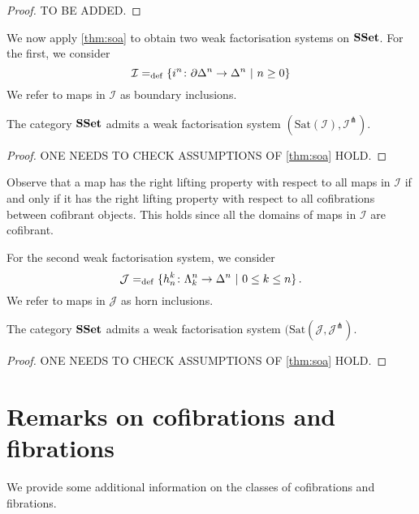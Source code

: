 \documentclass[reqno,10pt,a4paper,oneside,draft]{amsart}
\begin{document}
\begin{proof} TO BE ADDED.
\end{proof}


\bigskip




We now apply \cref{thm:soa} to obtain two weak factorisation systems on $\SSet$. For the first, 
we consider 
\[
\cal{I} \defeq \{ \inc{n} \co  \partial \Delt{n} \to \Delt{n} \ | \ n \geq 0 \}
\]
We refer to maps in $\mathcal{I}$ as boundary inclusions. 

\begin{proposition} The category $\SSet$ admits a weak factorisation system $(\mathrm{Sat}(\mathcal{I}), 
\mathcal{I}^\pitchfork)$.
\end{proposition}

\begin{proof} ONE NEEDS TO CHECK ASSUMPTIONS OF \cref{thm:soa} HOLD.
\end{proof}



Observe that  a map has the right lifting property with respect to all maps in $\mathcal{I}$
if and only if it has the right lifting property with respect to all cofibrations between cofibrant
objects. This holds since all the domains of maps in $\mathcal{I}$ are cofibrant.

\bigskip


For the second weak factorisation system, we consider 
\[
\cal{J} \defeq \{ \horninc{k}{n}  \co \Horn{k}{n} \to \Delt{n} \ | \ 0 \leq k \leq n \} \, .
\]
We refer to maps in $\mathcal{J}$ as horn inclusions.

\begin{proposition} The category $\SSet$ admits a weak factorisation system $(\mathrm{Sat}(\mathcal{J}, 
\mathcal{J}^\pitchfork)$.
\end{proposition}

\begin{proof} ONE NEEDS TO CHECK ASSUMPTIONS OF \cref{thm:soa} HOLD.
\end{proof}



\section{Remarks on cofibrations and fibrations}

We provide some additional information on the classes of cofibrations and fibrations. 

\bigskip
\end{document}
